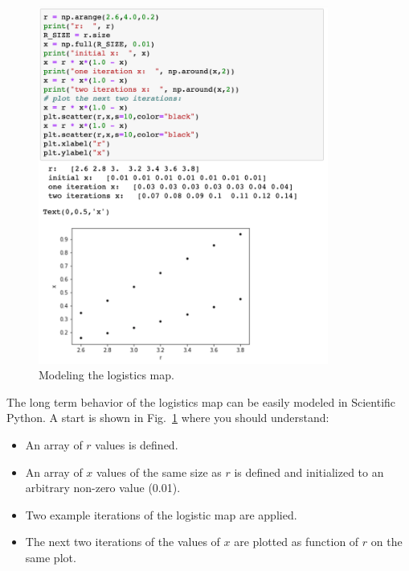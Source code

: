 \begin{figure}[htbp]
\begin{center}
\includegraphics[width=0.85\textwidth]{figs/plotting/logmapstart.png} 
\caption{Modeling the logistics map.}
\label{fig:logmapstart}
\end{center}
\end{figure}

The long term behavior of the logistics map can be easily modeled in
Scientific Python.  A start is shown in Fig.~\ref{fig:logmapstart}
where you should understand:
\begin{itemize}
\item An array of $r$ values is defined.
\item An array of $x$ values of the same size as $r$ is defined and initialized to an arbitrary non-zero value (0.01).
\item Two example iterations of the logistic map are applied.
\item The next two iterations of the values of $x$ are plotted as function of $r$ on the same plot.
\end{itemize}

